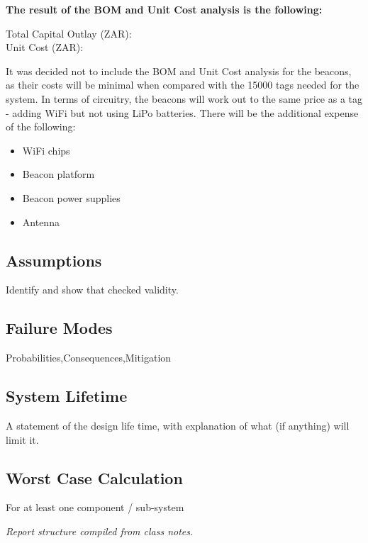 \textbf{The result of the BOM and Unit Cost analysis is the following:}

Total Capital Outlay (ZAR): \\
Unit Cost (ZAR):

It was decided not to include the BOM and Unit Cost analysis for the beacons, as their costs will be minimal when compared with the 15000 tags needed for the system. In terms of circuitry, the beacons will work out to the same price as a tag - adding WiFi but not using LiPo batteries. There will be the additional expense of the following:

\begin{itemize}
\item WiFi chips
\item Beacon platform
\item Beacon power supplies
\item Antenna 
\end{itemize}

\subsection{Assumptions}
Identify and show that checked validity.
\subsection{Failure Modes}
Probabilities,Consequences,Mitigation
\subsection{System Lifetime}
A statement of the design life time, with explanation of what (if anything) will limit it.
\subsection{Worst Case Calculation}
For at least one component / sub-system 

\textit{Report structure compiled from class notes.}\cite{handout}\cite{notes}



